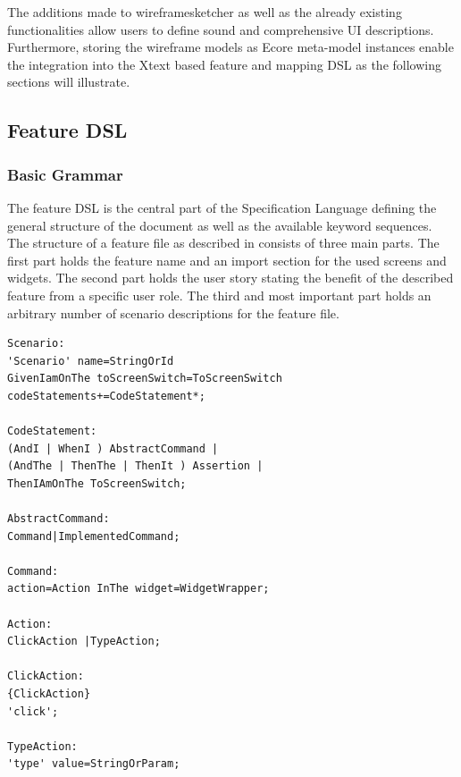 \documentclass{sig-alternate-05-2015}
\begin{document}
The additions made to wireframesketcher as well as the already existing functionalities allow users to define sound and comprehensive UI descriptions. 
Furthermore, storing the wireframe models as Ecore meta-model instances enable the integration into the Xtext based feature and mapping DSL as the following sections will illustrate.

\subsection{Feature DSL}
\subsubsection{Basic Grammar}
The feature DSL is the central part of the Specification Language defining the general structure of the document as well as the available keyword sequences.
The structure of a feature file as described in  consists of three main parts.
The first part holds the feature name and an import section for the used screens and widgets.
The second part holds the user story stating the benefit of the described feature from a specific user role.
The third and most important part holds an arbitrary number of scenario descriptions for the feature file.

\begin{lstlisting}[captionpos=b, caption=Feature Grammar, label={lst:featureGrammar}, language=xtext]
Scenario:
'Scenario' name=StringOrId
GivenIamOnThe toScreenSwitch=ToScreenSwitch 
codeStatements+=CodeStatement*;

CodeStatement:
(AndI | WhenI ) AbstractCommand | 
(AndThe | ThenThe | ThenIt ) Assertion |   
ThenIAmOnThe ToScreenSwitch;

AbstractCommand:
Command|ImplementedCommand;

Command:
action=Action InThe widget=WidgetWrapper;

Action:
ClickAction |TypeAction;

ClickAction:
{ClickAction}
'click';

TypeAction:
'type' value=StringOrParam;
\end{lstlisting}
\end{document}
